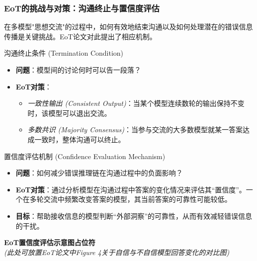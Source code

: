 \documentclass[aspectratio=169]{beamer} %
\begin{document}
\begin{frame}[allowframebreaks]
\frametitle{EoT的挑战与对策：沟通终止与置信度评估}
在多模型"思想交流"的过程中，如何有效地结束沟通以及如何处理潜在的错误信息传播是关键挑战。EoT论文对此提出了相应机制。

\begin{block}{沟通终止条件 (Termination Condition)}
    \begin{itemize}
        \item \textbf{问题}：模型间的讨论何时可以告一段落？
        \item \textbf{EoT对策}：
        \begin{itemize}
            \item \textit{一致性输出 (Consistent Output)}：当某个模型连续数轮的输出保持不变时，该模型可以退出交流。
            \item \textit{多数共识 (Majority Consensus)}：当参与交流的大多数模型就某一答案达成一致时，整体沟通可以终止。
        \end{itemize}
    \end{itemize}
\end{block}

\begin{block}{置信度评估机制 (Confidence Evaluation Mechanism)}
    \begin{itemize}
        \item \textbf{问题}：如何减少错误推理链在沟通过程中的负面影响？
        \item \textbf{EoT对策}：通过分析模型在沟通过程中答案的变化情况来评估其“置信度”。一个在多轮交流中频繁改变答案的模型，其当前答案的可靠性可能较低。
        \item \textbf{目标}：帮助接收信息的模型判断“外部洞察”的可靠性，从而有效减轻错误信息的干扰。
    \end{itemize}
\end{block}
\begin{center}
    \vspace{0.5cm}
    \textbf{EoT置信度评估示意图占位符}\\
    \textit{(此处可放置EoT论文中Figure 4关于自信与不自信模型回答变化的对比图)}
\end{center}
\end{frame}
\end{document}

